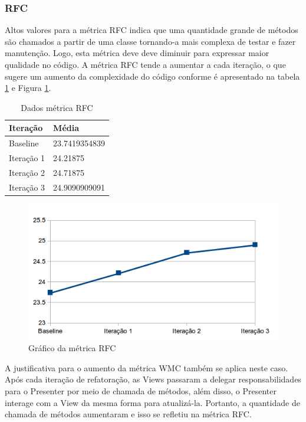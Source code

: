 \documentclass[conference]{IEEEtran}
\begin{document}
\subsubsection{RFC}

Altos valores para a métrica RFC indica que uma quantidade grande de métodos são
chamados a partir de uma classe tornando-a mais complexa de testar e fazer
manutenção. Logo, esta métrica deve deve diminuir para expressar maior
qualidade no código. A métrica RFC tende a aumentar a cada iteração, o que
sugere um aumento da complexidade do código conforme é apresentado na tabela \ref{tab:rfc} e Figura
\ref{fig:rfc}.

\begin{table}[!h]
	\centering
	    \caption{\label{tab:rfc} Dados métrica RFC}
    \begin{tabular}{ | l | l | }
    \hline
    Iteração & Média 			\\ \hline
    Baseline & 23.7419354839   	\\ \hline
    Iteração 1 & 24.21875		\\ \hline
	Iteração 2 & 24.71875		\\ \hline
	Iteração 3 & 24.9090909091	\\ \hline
    \end{tabular}
    
\end{table}

\begin{figure}[htb]
	\begin{center}
		\includegraphics[scale=0.7]{img/rfc.png}
	\end{center}
	\caption{\label{fig:rfc} Gráfico da métrica RFC}   
	
\end{figure}


A justificativa para o aumento da métrica WMC também se aplica neste caso.
Após cada iteração de refatoração, as Views passaram a delegar
responsabilidades para o Presenter por meio de chamada de métodos, além disso, o Presenter interage com a
View da mesma forma para atualizá-la. Portanto, a quantidade de chamada de
métodos aumentaram e isso se refletiu na métrica RFC.
\end{document}
